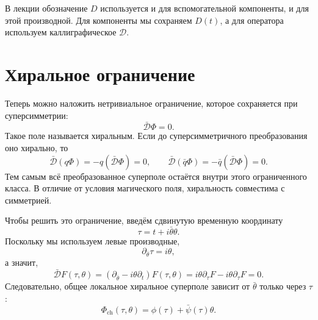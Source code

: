 В лекции обозначение \(D\) используется и для вспомогательной компоненты, и для этой производной. Для компоненты мы сохраняем \(D(t)\), а для оператора используем каллиграфическое \(\mathcal D\).

\section{Хиральное ограничение}

Теперь можно наложить нетривиальное ограничение, которое сохраняется при суперсимметрии:
\begin{equation}
\bar{\mathcal D}\Phi=0.
\label{eq:l7-chiral-constraint}
\end{equation}
Такое поле называется хиральным. Если до суперсимметричного преобразования оно хирально, то
\begin{equation}
\bar{\mathcal D}(q\Phi)
=-q(\bar{\mathcal D}\Phi)=0,
\qquad
\bar{\mathcal D}(\bar q\Phi)
=-\bar q(\bar{\mathcal D}\Phi)=0.
\end{equation}
Тем самым всё преобразованное суперполе остаётся внутри этого ограниченного класса. В отличие от условия магического поля, хиральность совместима с симметрией.

Чтобы решить это ограничение, введём сдвинутую временную координату
\begin{equation}
\tau=t+i\bar\theta\theta.
\label{eq:l7-chiral-time}
\end{equation}
Поскольку мы используем левые производные,
\begin{equation}
\partial_{\bar\theta}\tau=i\theta,
\end{equation}
а значит,
\begin{equation}
\bar{\mathcal D}F(\tau,\theta)
=\left(\partial_{\bar\theta}-i\theta\partial_t\right)F(\tau,\theta)
=i\theta\partial_\tau F-i\theta\partial_\tau F=0.
\end{equation}
Следовательно, общее локальное хиральное суперполе зависит от \(\bar\theta\) только через \(\tau\):
\begin{equation}
\Phi_{\mathrm{ch}}(\tau,\theta)
=\phi(\tau)+\bar\psi(\tau)\theta.
\label{eq:l7-chiral-field-tau}
\end{equation}

\begin{classroomqa}
\end{classroomqa}

